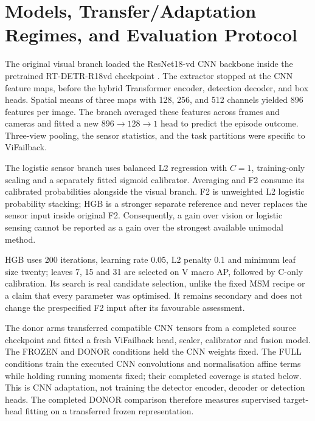 \section{Models, Transfer/Adaptation Regimes, and Evaluation Protocol}
The original visual branch loaded the ResNet18-vd CNN backbone inside the pretrained
RT-DETR-R18vd checkpoint \parencite{Zhao2024RTDETR}. The extractor stopped at the CNN
feature maps, before the hybrid Transformer encoder, detection decoder, and box heads.
Spatial means of three maps with 128, 256, and 512 channels yielded 896 features per
image. The branch averaged these features across frames and cameras and fitted a new
$896\rightarrow128\rightarrow1$ head to predict the episode outcome. Three-view pooling,
the sensor statistics, and the task partitions were specific to ViFailback.

The logistic sensor branch uses balanced L2 regression with $C=1$, training-only scaling
and a separately fitted sigmoid calibrator. Averaging and F2 consume its calibrated
probabilities alongside the visual branch. F2 is unweighted L2 logistic probability
stacking; HGB is a stronger separate reference and never replaces the sensor input
inside original F2. Consequently, a gain over vision or logistic sensing cannot be
reported as a gain over the strongest available unimodal method.

HGB uses 200 iterations, learning rate 0.05, L2 penalty 0.1 and minimum leaf size
twenty; leaves 7, 15 and 31 are selected on V macro AP, followed by C-only calibration.
Its search is real candidate selection, unlike the fixed MSM recipe or a claim that
every parameter was optimised. It remains secondary and does not change the prespecified
F2 input after its favourable assessment.


The donor arms transferred compatible CNN tensors from a completed source checkpoint and
fitted a fresh ViFailback head, scaler, calibrator and fusion model. The FROZEN and
DONOR conditions held the CNN weights fixed. The FULL conditions train the executed CNN
convolutions and normalisation affine terms while holding running moments fixed; their
completed coverage is stated below. This is CNN adaptation, not training the detector
encoder, decoder or detection heads. The completed DONOR comparison therefore measures
supervised target-head fitting on a transferred frozen representation.

